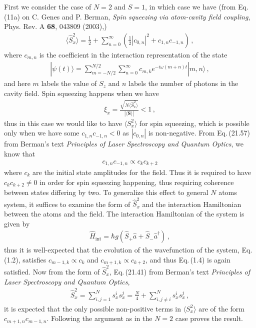 \documentclass[11pt, oneside]{book}
\theoremstyle{break}
\theoremstyle{break}
\begin{document}
\chapter{}
First we consider the case of $N=2$ and $S = 1$, in which case we have (from Eq.\,(11a) on C. Genes and P. Berman, \textit{Spin squeezing via atom-cavity field coupling}, Phys. Rev. A \textbf{68}, 043809 (2003),)
\begin{align}
\langle \hat{S}_x^2\rangle = \frac{1}{2} + \sum_{n=0}^\infty \left( \frac{1}{2}|c_{0,n}|^2 + c_{1,n}c_{-1,n}\right)\,,
\end{align}
where $c_{m,n}$ is the coefficient in the interaction representation of the state
\begin{align}
|\psi(t)\rangle = \sum_{m=-N/2}^{N/2} \sum_{n=0}^\infty c_{m,k}e^{-i\omega (m+n)t}|m,n\rangle\,,
\end{align}
and here $m$ labels the value of $S_z$ and $n$ labels the number of photons in the cavity field.  Spin squeezing happens when we have
\begin{align}
\xi_{x} = \frac{\sqrt{N \langle \hat{S}^2_x\rangle}}{|\langle \mathbf{S}\rangle |}<1\,,
\end{align}
thus in this case we would like to have $\langle S_x^2\rangle$ for spin squeezing, which is possible only when we have some $c_{1,n}c_{-1,n} < 0$ as $|c_{0,n}|$ is non-negative. From Eq.\,(21.57) from Berman's text \textit{Principles of Laser Spectroscopy and Quantum Optics}, we know that
\begin{align}
c_{1,n}c_{-1,n}\propto c_{k}c_{k+2}
\end{align}
where $c_k$ are the initial state amplitudes for the field. Thus it is required to have $c_{k}c_{k+2} \neq 0$ in order for spin squeezing happening, thus requiring coherence between states differing by two. To generalize this effect to general $N$ atoms system, it suffices to examine the form of $\hat{S}_x^2$ and the interaction Hamiltonian between the atoms and the field. The interaction Hamiltonian of the system is given by
\begin{align}
\hat{H}_{\text{int}} = \hbar g\left( \hat{S}_+ \hat{a} + \hat{S}_-\hat{a}^\dagger\right)\,,
\end{align}
thus it is well-expected that the evolution of the wavefunction of the system, Eq.\,(1.2), satisfies $c_{m-1,k}\propto c_k$ and $c_{m+1,k}\propto c_{k+2}$, and thus Eq.\,(1.4) is again satisfied. Now from the form of $\hat{S}_{x}^2$, Eq.\,(21.41) from Berman's text \textit{Principles of Laser Spectroscopy and Quantum Optics},
\begin{align*}
\hat{S}_x^2 = \sum_{i,j=1}^N s_x^is_x^j = \frac{N}{4}+ \sum_{i,j\neq i}^N s_x^i s_x^j\,,
\end{align*}
it is expected that the only possible non-positive terms in $\langle S_x^2\rangle$ are of the form $c_{m+1,n}c_{m-1,n}$. Following the argument as in the $N=2$ case proves the result. 
\end{document}
